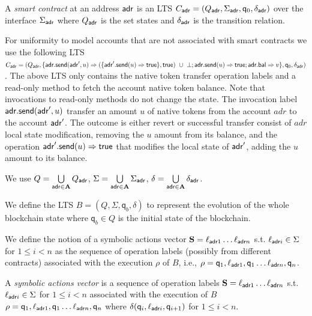 \begin{definition}\label{def:contract}
A \emph{smart contract} at an address $\mathsf{adr}$ is an LTS $C_{\mathsf{adr}}=(Q_{\mathsf{adr}},\Sigma_{\mathsf{adr}}, \mathsf{q}_0, \delta_{\mathsf{adr}})$ over the interface $\Sigma_{\mathsf{adr}}$ where $Q_{\mathsf{adr}}$ is the set states and $\delta_{\mathsf{adr}}$ is the transition relation.
\end{definition}

For uniformity to model accounts that are not associated with smart contracts we use the following LTS 
$C_{\adr}=(Q_{\adr},\{\adr.\send(\adr',u) \Rightarrow (\{\adr'.\send(u) \Rightarrow \mytrue\}, \mytrue)\ \cup\ \bot; \adr.\send(u) \Rightarrow \mytrue; \adr.\bal \Rightarrow v\}, \mathsf{q}_0, \delta_{\adr})$.  The above LTS only contains the native token transfer operation labels and a read-only method to fetch the account native token balance. Note that invocations to read-only methods do not change the state. The invocation label $\mathsf{adr}.\mathsf{send}(\mathsf{adr}',u)$ transfer an amount $u$ of native tokens from the account $adr$ to the account $\mathsf{adr}'$. The outcome is either revert or successful transfer consist of $adr$ local state modification, removing the $u$ amount from its balance, and the operation $\mathsf{adr}'.\mathsf{send}(u) \Rightarrow \mathsf{true}$ that modifies the local state of $\mathsf{adr}'$, adding the $u$ amount to its balance. 

We use $Q = \bigcup\limits_{\mathsf{adr} \in \mathbf{A}} Q_{\mathsf{adr}}$, $\Sigma = \bigcup\limits_{\mathsf{adr} \in \mathbf{A}} \Sigma_{\mathsf{adr}}$, $\delta = \bigcup\limits_{\mathsf{adr} \in \mathbf{A}} \delta_{\mathsf{adr}}$. 

\begin{definition}
We define the LTS $B = (Q,\Sigma,\mathsf{q}_b,\delta)$ to represent the evolution of the whole blockchain state where $\mathsf{q}_b \in Q$ is the initial state of the blockchain. 
\end{definition}

We define the notion of a symbolic actions vector $\mathbf{S} = \ell_{\mathsf{adr} 1} \ldots \ell_{\mathsf{adr} n}$ s.t.  $\ell_{\mathsf{adr} i}\in \Sigma$ for $1\leq i<n$ as the sequence of operation labels (possibly from different  contracts) associated with the execution $\rho$ of $B$, i.e., $\rho = \mathsf{q}_1, \ell_{\mathsf{adr} 1},\mathsf{q}_1\ldots \ell_{\mathsf{adr} n},\mathsf{q}_n$. 
 

\begin{definition}
A \emph{symbolic actions vector} is a sequence of operation labels $\mathbf{S} = \ell_{\mathsf{adr} 1} \ldots \ell_{\mathsf{adr} n}$ s.t.  $\ell_{\mathsf{adr} i}\in \Sigma$ for $1\leq i<n$ associated with the execution of $B$  $\rho = \mathsf{q}_1, \ell_{\mathsf{adr} 1},\mathsf{q}_1\ldots \ell_{\mathsf{adr} n},\mathsf{q}_n$ where $\delta(\mathsf{q}_i, \ell_{\mathsf{adr} i}, \mathsf{q}_{i+1})$ for $1\leq i<n$.
\end{definition}



